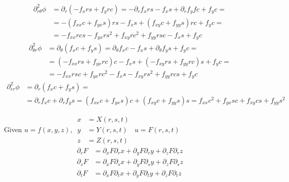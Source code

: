 \documentclass[twoside]{amsart}
\theoremstyle{plain}
\theoremstyle{definition}
\newcommand{\exercisehead}[1]
  {
   \noindent{\small\bf Exercise #1.}
   \smallskip}
\begin{document}
\[
\begin{aligned}
  \partial_{r\theta}^2 \phi & = \partial_r (-f_x rs + f_y rc) = -\partial_r f_x rs - f_x s + \partial_r f_y fc + f_y c = \\
  & = -(f_{xx} c + f_{yx} s) rs - f_x s + (f_{xy} c + f_{yy} s)rc + f_y c = \\
  & = -f_{xx} rcs - f_{yx} r s^2 + f_{xy} rc^2 + f_{yy} rsc - f_x s + f_y c 
\end{aligned}
\]
\[
\begin{aligned}
  \partial_{\theta r}^2 \phi & = \partial_{\theta} (f_x c + f_y s) = \partial_{\theta} f_x c - f_x s + \partial_{\theta} f_y s + f_y c = \\
  & = (-f_{xx} rs + f_{yx} rc )c  -f_x s + (-f_{xy} rs + f_{yy} rc )s + f_y c = \\
  & = -f_{xx} rsc + f_{yx} rc^2 - f_x s - f_{xy} rs^2 + f_{yy} rcs + f_y c 
\end{aligned}
\]
\[
\begin{aligned}
  \partial_{rr}^2 \phi & = \partial_r (f_x c + f_y s) = \\
  & = \partial_r f_x c + \partial_r f_y s = (f_{xx} c + f_{yx} s) c + (f_{xy}c + f_{yy} s) s = f_{xx} c^2 + f_{yx} sc + f_{xy} cs + f_{yy} s^2 
\end{aligned}
\]

\exercisehead{6} Given $u = f(x,y,z)$, $\begin{aligned} x & = X(r,s,t) \\
  y & = Y(r,s,t) \\
  z & = Z(r,s,t) 
\end{aligned}$ \quad \quad $u = F(r,s,t)$ 
\[
\begin{aligned}
  \partial_r F & = \partial_x F \partial_r x + \partial_y F \partial_r y + \partial_z F \partial_r z \\
  \partial_s F & = \partial_x F \partial_s x + \partial_y F \partial_s y + \partial_z F \partial_s z \\
  \partial_t F & = \partial_x F \partial_t x + \partial_y F \partial_t y + \partial_z F \partial_t z 
\end{aligned}
\]
\end{document}
